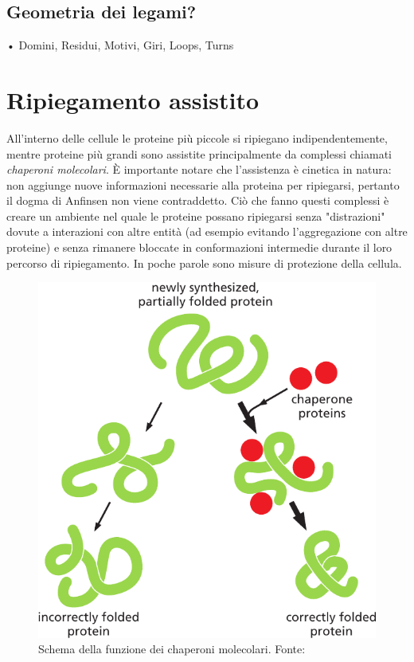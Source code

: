 \subsection{Geometria dei legami?}

• Domini, Residui, Motivi, Giri, Loops, Turns\\

\section{Ripiegamento assistito} \label{sec:assisted-folding}
All'interno delle cellule le proteine più piccole si ripiegano indipendentemente, mentre proteine più grandi sono assistite principalmente da complessi chiamati \textit{chaperoni molecolari}. È  importante notare che l'assistenza è cinetica in natura: non aggiunge nuove informazioni necessarie alla proteina per ripiegarsi, pertanto il dogma di Anfinsen non viene contraddetto. Ciò che fanno questi complessi è creare un ambiente nel quale le proteine possano ripiegarsi senza "distrazioni" dovute a interazioni con altre entità (ad esempio evitando l'aggregazione con altre proteine) e senza rimanere bloccate in conformazioni intermedie durante il loro percorso di ripiegamento. In poche parole sono misure di protezione della cellula. 

\begin{figure}[h]
	\centering
	\includegraphics[scale=0.4]{images/chaperone-alberts.png}
	\caption{Schema della funzione dei chaperoni molecolari. Fonte: \cite{alberts2018essential}}
	\label{fig:chaperoni}
\end{figure}


